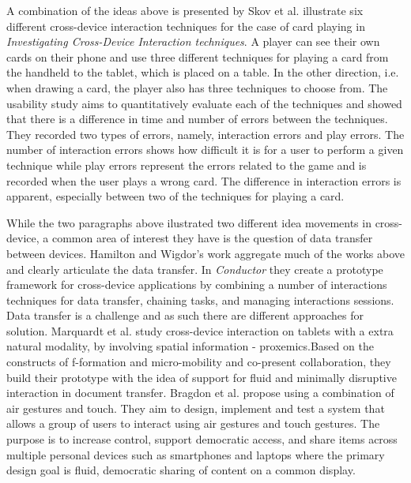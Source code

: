A combination of the ideas above is presented by Skov et al. \cite{Skov:2015} illustrate six different cross-device interaction techniques for the case of card playing in \emph{Investigating Cross-Device Interaction techniques}.
A player can see their own cards on their phone and use three different techniques for playing a card from the handheld to the tablet, which is placed on a table.
In the other direction, i.e. when drawing a card, the player also has three techniques to choose from.
The usability study aims to quantitatively evaluate each of the techniques and showed that there is a difference in time and number of errors between the techniques. 
They recorded two types of errors, namely, interaction errors and play errors.
The number of interaction errors shows how difficult it is for a user to perform a given technique while play errors represent the errors related to the game and is recorded when the user plays a wrong card.
The difference in interaction errors is apparent, especially between two of the techniques for playing a card.

While the two paragraphs above ilustrated two different idea movements in cross-device, a common area of interest they have is the question of data transfer between devices.
Hamilton and Wigdor's  work \cite{Hamilton:2014} aggregate much of the works above and clearly articulate the data transfer. In \emph{Conductor} they create a prototype framework for cross-device applications by combining a number of interactions techniques for data transfer, chaining tasks, and managing interactions sessions.
Data transfer is a challenge and as such there are different approaches for solution. Marquardt et al. \cite{Marquardt:2012} study cross-device interaction on tablets with a extra natural modality, by involving spatial information - proxemics.Based on the constructs of f-formation and micro-mobility and co-present collaboration, they build their prototype with the idea of support for fluid and minimally disruptive interaction in document transfer. 
Bragdon et al.\cite{Bragdon:2011} propose using a combination of air gestures and touch.
They aim to design, implement and test a system that allows a group of users to interact using air gestures and touch gestures. The purpose is to increase control, support democratic access, and share items across multiple personal devices such as smartphones and laptops where the primary design goal is fluid, democratic sharing of content on a common display.

